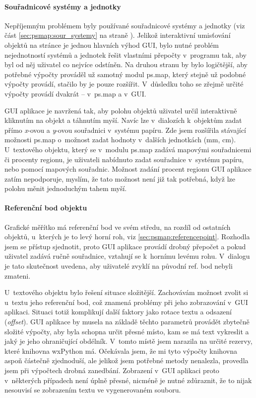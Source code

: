 \documentclass[a4paper,12pt,draft]{article}
\begin{document}
\paragraph*{Souřadnicové systémy a jednotky} Nepříjemným problémem
byly používané souřadnicové systémy a jednotky (viz část
\ref{sec:psmap:sour_systemy} na straně \pageref{sec:psmap:sour_systemy}).
 Jelikož interaktivní umisťování objektů na stránce je jednou hlavních
 výhod GUI, bylo nutné problém nejednotností systémů
 a jednotek řešit vlastními přepočty v~programu tak, aby byl od něj
 uživatel co nejvíce odstíněn. Na druhou stranu by bylo logičtější,
 aby potřebné výpočty prováděl už samotný modul ps.map,
 který stejně už podobné výpočty provádí, stačilo by je pouze
 rozšířit. V~důsledku toho se zřejmě určité výpočty provádí
 dvakrát -- v~ps.map a v~GUI.

 GUI aplikace je navržená tak, aby polohu objektů uživatel určil
 interaktivně kliknutím na objekt a táhnutím myší. Navíc lze
 v~dialozích k~objektům zadat přímo \emph{x}-ovou a \emph{y}-ovou
 souřadnici v~systému papíru. Zde jsem rozšířila stávající možnosti
ps.map o~možnost zadat hodnoty v~dalších jednotkách (mm, cm).
 U~textového objektu, který se v~modulu ps.map zadává mapovými
 souřadnicemi či procenty regionu, je uživateli nabídnuto
 zadat souřadnice v~systému papíru, nebo pomocí mapových
 souřadnic. Možnost zadání procent regionu GUI aplikace zatím nepodporuje,
 myslím, že tato možnost není již tak potřebná, když lze polohu
 měnit jednoduchým tahem myší.

 \paragraph*{Referenční bod objektu}
 Grafické měřítko má referenční bod ve svém středu, na rozdíl
 od ostatních objektů, u~kterých je to levý horní roh, viz
 \ref{sec:psmap:referencepoint}. Rozhodla jsem se přístup sjednotit,
 proto GUI aplikace provádí drobný přepočet a pokud uživatel zadává
 ručně souřadnice, vztahují se k~hornímu levému rohu. V~dialogu je
 tato skutečnost uvedena, aby uživatelé zvyklí na původní ref. bod
 nebyli zmateni.

 U~textového objektu bylo řešení situace složitější. Zachovávám
 možnost zvolit si u~textu jeho referenční bod, což znamená problémy
 při jeho zobrazování v~GUI aplikaci. Situaci totiž komplikují další
 faktory jako rotace textu a odsazení (\emph{offset}).
 GUI aplikace by musela na základě těchto parametrů provádět zbytečně
 složité výpočty, aby byla schopna určit přesné místo, kam se
 má text vykreslit a jaký je jeho ohraničující obdélník. V~tomto
 místě jsem narazila na určité rezervy, které knihovna wxPython
 má. Očekávala jsem, že mi tyto výpočty knihovna aspoň částečně
 zjednoduší, ale jelikož jsem potřebné metody nenalezla, provedla
 jsem při výpočtech drobná zanedbání. Zobrazení v~GUI aplikaci proto
 v~některých případech není úplně přesné, nicméně je nutné
 zdůraznit, že to nijak nesouvisí se zobrazením textu ve  vygenerovaném
 souboru.
\end{document}
